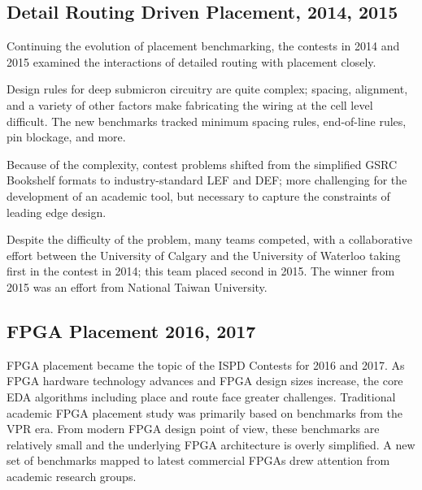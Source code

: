 \documentclass[sigconf]{acmart}
\begin{document}
\subsection{Detail Routing Driven Placement, 2014, 2015}

Continuing the evolution of placement benchmarking,
the contests in 2014 and 2015 examined the interactions
of detailed routing with placement closely\cite{Yutsis14,Bustany15}.

Design rules for deep submicron circuitry are quite complex;
spacing, alignment, and a variety of other factors make
fabricating the wiring at the cell level difficult.  The new
benchmarks tracked minimum spacing rules, end-of-line rules,
pin blockage, and more.

Because of the complexity, contest problems shifted from the
simplified GSRC Bookshelf formats to industry-standard LEF
and DEF; more challenging for the development of an academic
tool, but necessary to capture the constraints of leading edge
design.

Despite the difficulty of the problem, many teams competed, with a
collaborative effort between the University of Calgary and the
University of Waterloo taking first in the contest in
2014\cite{Darav15}; this team placed second in 2015\cite{Darav16}.
The winner from 2015 was an effort from National
Taiwan University\cite{Huang15}.

\iffalse

\cite{Yutsis14}
Details, cite some papers.
Detail Routing.
{\bf Ismail?}
\fi


\subsection{FPGA Placement 2016, 2017}

FPGA placement became the topic of the ISPD Contests for 2016 and 2017. As
FPGA hardware technology advances and FPGA design sizes increase, the
core EDA algorithms including place and route face greater
challenges. Traditional academic FPGA placement study was primarily
based on benchmarks from the VPR\cite{Betz97} era. From modern FPGA design
point of view, these benchmarks are relatively small and the
underlying FPGA architecture is overly simplified. A new set of
benchmarks mapped to latest commercial FPGAs drew attention from
academic research groups.
\end{document}
